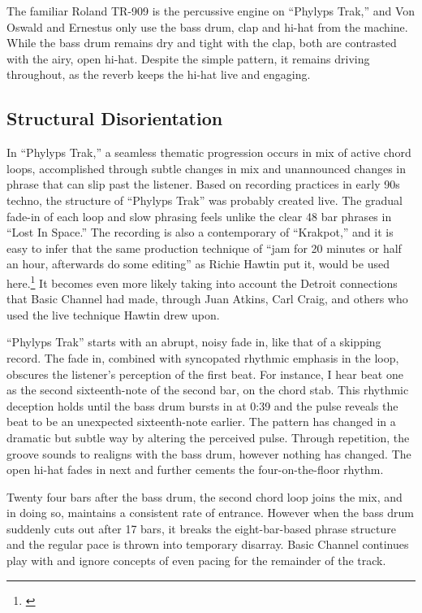 \documentclass[12pt,twoside]{reedthesis}
\begin{document}
The familiar Roland TR-909 is the percussive engine on ``Phylyps Trak,'' and Von Oswald and Ernestus only use the bass drum, clap and hi-hat from the machine. While the bass drum remains dry and tight with the clap, both are contrasted with the airy, open hi-hat. Despite the simple pattern, it remains driving throughout, as the reverb keeps the hi-hat live and engaging.

\subsection{Structural Disorientation}

In ``Phylyps Trak,'' a seamless thematic progression occurs in mix of active chord loops, accomplished through subtle changes in mix and unannounced changes in phrase that can slip past the listener. Based on recording practices in early 90s techno, the structure of ``Phylyps Trak'' was probably created live. The gradual fade-in of each loop and slow phrasing feels unlike the clear 48 bar phrases in ``Lost In Space.'' The recording is also a contemporary of ``Krakpot,'' and it is easy to infer that the same production technique of ``jam for 20 minutes or half an hour, afterwards do some editing'' as Richie Hawtin put it, would be used here.\footnote{\cite{burnsRichieHawtinLecture2013}} It becomes even more likely taking into account the Detroit connections that Basic Channel had made, through Juan Atkins, Carl Craig, and others who used the live technique Hawtin drew upon. 

``Phylyps Trak'' starts with an abrupt, noisy fade in, like that of a skipping record. The fade in, combined with syncopated rhythmic emphasis in the loop, obscures the listener's perception of the first beat. For instance, I hear beat one as the second sixteenth-note of the second bar, on the chord stab. This rhythmic deception holds until the bass drum bursts in at 0:39 and the pulse reveals the beat to be an unexpected sixteenth-note earlier. The pattern has changed in a dramatic but subtle way by altering the perceived pulse. Through repetition, the groove sounds to realigns with the bass drum, however nothing has changed. The open hi-hat fades in next and further cements the four-on-the-floor rhythm.

Twenty four bars after the bass drum, the second chord loop joins the mix, and in doing so, maintains a consistent rate of entrance. However when the bass drum suddenly cuts out after 17 bars, it breaks the eight-bar-based phrase structure and the regular pace is thrown into temporary disarray. Basic Channel continues play with and ignore concepts of even pacing for the remainder of the track.
\end{document}
